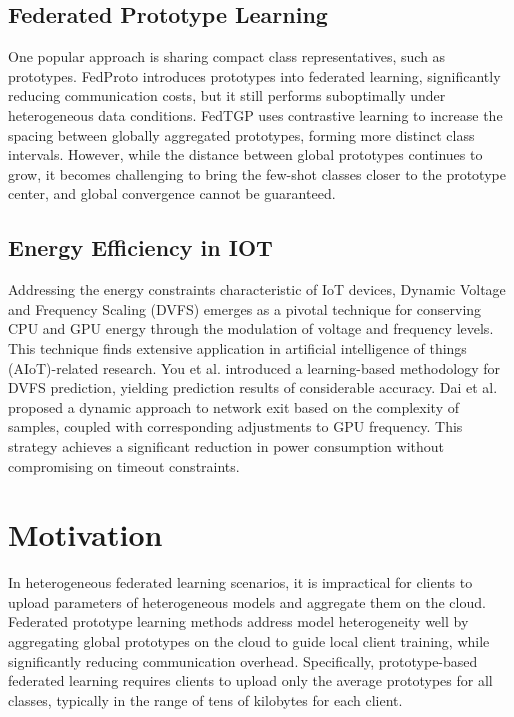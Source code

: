 \documentclass[journal]{IEEEtran}
\begin{document}
\subsection{Federated Prototype Learning}
One popular approach is sharing compact class representatives, such as prototypes. FedProto\cite{tan_fedproto_2021} introduces prototypes into federated learning, significantly reducing communication costs, but it still performs suboptimally under heterogeneous data conditions. FedTGP\cite{zhang_fedtgp_2024} uses contrastive learning to increase the spacing between globally aggregated prototypes, forming more distinct class intervals. However, while the distance between global prototypes continues to grow, it becomes challenging to bring the few-shot classes closer to the prototype center, and global convergence cannot be guaranteed.

\subsection{Energy Efficiency in IOT}
Addressing the energy constraints characteristic of IoT devices, Dynamic Voltage and Frequency Scaling (DVFS) emerges as a pivotal technique for conserving CPU and GPU energy through the modulation of voltage and frequency levels. This technique finds extensive application in artificial intelligence of things (AIoT)-related research. You et al. \cite{you2023zeus} introduced a learning-based methodology for DVFS prediction, yielding prediction results of considerable accuracy. Dai et al.\cite{dai2024energy} proposed a dynamic approach to network exit based on the complexity of samples, coupled with corresponding adjustments to GPU frequency. This strategy achieves a significant reduction in power consumption without compromising on timeout constraints.


\section{Motivation}
In heterogeneous federated learning scenarios, it is impractical for clients to upload parameters of heterogeneous models and aggregate them on the cloud. Federated prototype learning methods address model heterogeneity well by aggregating global prototypes on the cloud to guide local client training, while significantly reducing communication overhead. Specifically, prototype-based federated learning requires clients to upload only the average prototypes for all classes, typically in the range of tens of kilobytes for each client. 
\end{document}
